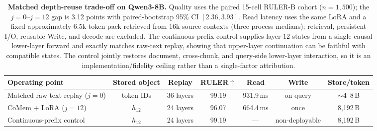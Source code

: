 \begin{table}[t]
\centering
\small
\setlength{\tabcolsep}{4.2pt}
\begin{tabular}{@{}lcccccc@{}}
\toprule
\textbf{Operating point} & \textbf{Stored object} & \textbf{Replay} &
\textbf{RULER}$\uparrow$ & \textbf{Read} & \textbf{Write} &
\textbf{Store/token} \\
\midrule
Matched raw-text replay ($j{=}0$) & token IDs & 36 layers &
99.19 & 931.9\,ms & on query & $\sim$4--8\,B \\
CoMem + LoRA ($j{=}12$) & $h_{12}$ & 24 layers &
96.07 & 664.4\,ms & once & 8,192\,B \\
Continuous-prefix control & $h_{12}$ & 24 layers &
99.19 & --- & non-deployable & 8,192\,B \\
\bottomrule
\end{tabular}
\caption{\textbf{Matched depth-reuse trade-off on Qwen3-8B.}
Quality uses the paired 15-cell RULER-B cohort ($n{=}1{,}500$); the
$j{=}0$--$j{=}12$ gap is 3.12 points with paired-bootstrap 95\% CI
$[2.36,3.93]$. Read latency uses the same LoRA and a fixed approximately
6.5k-token pack retrieved from 16k source contexts
(three process medians); retrieval, persistent I/O, reusable Write, and decode
are excluded. The continuous-prefix control supplies layer-12 states from a
single causal lower-layer forward and exactly matches raw-text replay, showing
that upper-layer continuation can be faithful with compatible states. The
control jointly restores document, cross-chunk, and query-side lower-layer
interaction, so it is an implementation/fidelity ceiling rather than a
single-factor attribution.}
\label{tab:core-tradeoff}
\end{table}

